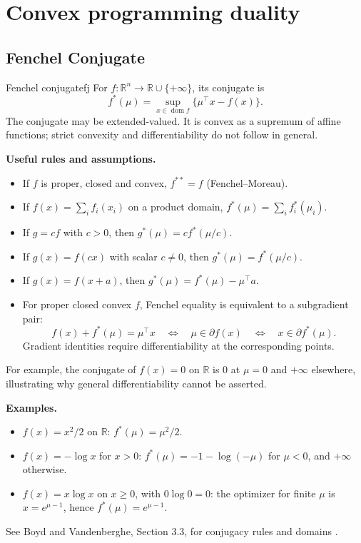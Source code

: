 \documentclass[11pt, a4paper]{article}
\begin{document}
\section{Convex programming duality}
\subsection{Fenchel Conjugate}
\begin{definition}{Fenchel conjugate}{fj}
For $f:\mathbb R^n\to\mathbb R\cup\{+\infty\}$, its conjugate is
\[
f^*(\mu)=\sup_{x\in\operatorname{dom}f}\{\mu^\top x-f(x)\}.
\]
The conjugate may be extended-valued. It is convex as a supremum of affine functions; strict convexity and differentiability do not follow in general.
\end{definition}

\noindent\textbf{Useful rules and assumptions.}
\begin{itemize}
\item If $f$ is proper, closed and convex, $f^{**}=f$ (Fenchel--Moreau).
\item If $f(x)=\sum_i f_i(x_i)$ on a product domain, $f^*(\mu)=\sum_i f_i^*(\mu_i)$.
\item If $g=cf$ with $c>0$, then $g^*(\mu)=cf^*(\mu/c)$.
\item If $g(x)=f(cx)$ with scalar $c\ne0$, then $g^*(\mu)=f^*(\mu/c)$.
\item If $g(x)=f(x+a)$, then $g^*(\mu)=f^*(\mu)-\mu^\top a$.
\item For proper closed convex $f$, Fenchel equality is equivalent to a subgradient pair:
\[
f(x)+f^*(\mu)=\mu^\top x
\quad\Longleftrightarrow\quad
\mu\in\partial f(x)
\quad\Longleftrightarrow\quad
x\in\partial f^*(\mu).
\]
Gradient identities require differentiability at the corresponding points.
\end{itemize}
For example, the conjugate of $f(x)=0$ on $\mathbb R$ is $0$ at $\mu=0$ and $+\infty$ elsewhere, illustrating why general differentiability cannot be asserted.

\noindent\textbf{Examples.}
\begin{itemize}
\item $f(x)=x^2/2$ on $\mathbb R$: $f^*(\mu)=\mu^2/2$.
\item $f(x)=-\log x$ for $x>0$: $f^*(\mu)=-1-\log(-\mu)$ for $\mu<0$, and $+\infty$ otherwise.
\item $f(x)=x\log x$ on $x\ge0$, with $0\log0=0$: the optimizer for finite $\mu$ is $x=e^{\mu-1}$, hence $f^*(\mu)=e^{\mu-1}$.
\end{itemize}
See Boyd and Vandenberghe, Section 3.3, for conjugacy rules and domains \cite{boyd2004}.
\end{document}
